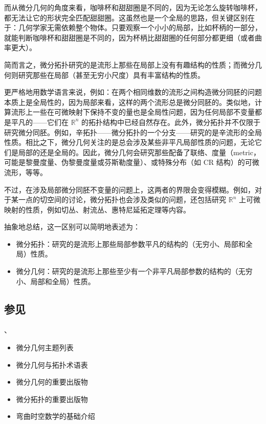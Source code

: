 而从微分几何的角度来看，咖啡杯和甜甜圈是不同的，因为无论怎么旋转咖啡杯，都无法让它的形状完全匹配甜甜圈。这虽然也是一个全局的思路，但关键区别在于：几何学家无需依赖整个物体。只要观察一个小小的局部，比如杯柄的一部分，就能判断咖啡杯和甜甜圈是不同的，因为杯柄比甜甜圈的任何部分都更细（或者曲率更大）。

简而言之，微分拓扑研究的是流形上那些在局部上没有有趣结构的性质；而微分几何则研究那些在局部（甚至无穷小尺度）具有丰富结构的性质。

更严格地用数学语言来说，例如：在两个相同维数的流形之间构造微分同胚的问题本质上是全局性的，因为局部来看，这样的两个流形总是微分同胚的。类似地，计算流形上一些在可微映射下保持不变的量也是全局性问题，因为任何局部不变量都是平凡的——它们在 $\mathbb{R}^n$ 的拓扑结构中已经自然存在。此外，微分拓扑并不仅限于研究微分同胚。例如，辛拓扑——微分拓扑的一个分支——研究的是辛流形的全局性质。相比之下，微分几何关注的是总会涉及某些非平凡局部性质的问题，无论它们是局部的还是全局的。因此，微分几何会研究那些配备了联络、度量（metric，可能是黎曼度量、伪黎曼度量或芬斯勒度量）、或特殊分布（如 CR 结构）的可微流形，等等。

不过，在涉及局部微分同胚不变量的问题上，这两者的界限会变得模糊。例如，对于某一点的切空间的讨论，微分拓扑也会涉及类似的问题，还包括研究 $\mathbb{R}^n$ 上可微映射的性质，例如切丛、射流丛、惠特尼延拓定理等内容。

抽象地总结，这一区别可以简明地表述为：
\begin{itemize}
\item 微分拓扑：研究的是流形上那些局部参数平凡的结构的（无穷小、局部和全局）性质。
\item 微分几何：研究的是流形上那些至少有一个非平凡局部参数的结构的（无穷小、局部和全局）性质。
\end{itemize}
\subsection{参见}、
\begin{itemize}
\item 微分几何主题列表
\item 微分几何与拓扑术语表
\item 微分几何的重要出版物
\item 微分拓扑的重要出版物
\item 弯曲时空数学的基础介绍
\end{itemize}
